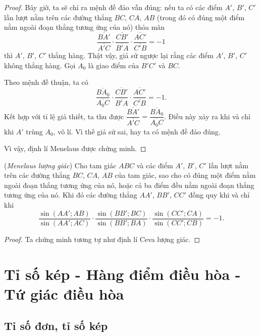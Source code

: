 \begin{proof}
            Bây giờ, ta sẽ chỉ ra mệnh đề đảo vẫn đúng: nếu ta có các điểm \(A'\), \(B'\), \(C'\) lần lượt nằm trên các đường thẳng \(BC\), \(CA\), \(AB\) (trong đó có đúng một điểm nằm ngoài đoạn thẳng tương ứng của nó) thỏa mãn
            \[\frac{\overline{BA'}}{\overline{A'C}} \cdot \frac{\overline{CB'}}{\overline{B'A}} \cdot \frac{\overline{AC'}}{\overline{C'B}} = -1\]
            thì \(A'\), \(B'\), \(C'\) thẳng hàng. Thật vậy, giả sử ngược lại rằng các điểm \(A'\), \(B'\), \(C'\) không thẳng hàng. Gọi \(A_0\) là giao điểm của \(B'C'\) và \(BC\).

            Theo mệnh đề thuận, ta có
            \[\frac{\overline{BA_0}}{\overline{A_0C}} \cdot \frac{\overline{CB'}}{\overline{B'A}} \cdot \frac{\overline{AC'}}{\overline{C'B}} = -1.\]
            Kết hợp với tỉ lệ giả thiết, ta thu được \(\dfrac{\overline{BA'}}{\overline{A'C}} = \dfrac{\overline{BA_0}}{\overline{A_0C}}\). Điều này xảy ra khi và chỉ khi \(A'\) trùng \(A_0\), vô lí. Vì thế giả sử sai, hay ta có mệnh đề đảo đúng.

            Vì vậy, định lí Menelaus được chứng minh.
        \end{proof}

        \begin{theorem}
            (\textit{Menelaus lượng giác}) Cho tam giác \(ABC\) và các điểm \(A'\), \(B'\), \(C'\) lần lượt nằm trên các đường thẳng \(BC\), \(CA\), \(AB\) của tam giác, sao cho có đúng một điểm nằm ngoài đoạn thẳng tương ứng của nó, hoặc cả ba điểm đều nằm ngoài đoạn thẳng tương ứng của nó. Khi đó các đường thẳng \(AA'\), \(BB'\), \(CC'\) đồng quy khi và chỉ khi
            \[\frac{\sin (AA';AB)}{\sin (AA';AC)} \cdot \frac{\sin (BB';BC)}{\sin (BB';BA)} \cdot \frac{\sin (CC';CA)}{\sin (CC';CB)} = -1.\]
        \end{theorem}

        \begin{proof}
            Ta chứng minh tương tự như định lí Ceva lượng giác.
        \end{proof}

\section{Tỉ số kép - Hàng điểm điều hòa - Tứ giác điều hòa}

    \subsection{Tỉ số đơn, tỉ số kép}

